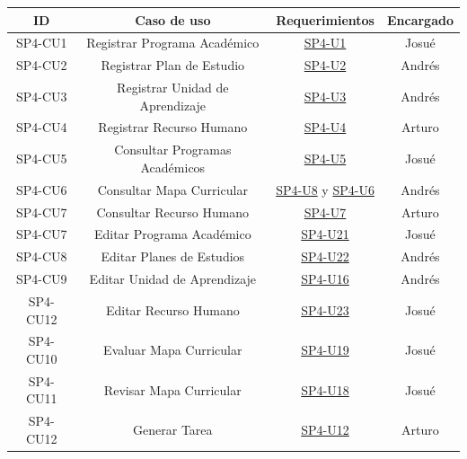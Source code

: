 \begin{center}
	\begin{tabular}{|c|c|c|c|}
		\hline
		ID         & Caso de uso                        & Requerimientos                                           & Encargado \\ \hline
        SP4-CU1    & Registrar Programa Académico       & \hyperref[SP4-U1]{SP4-U1}                                & Josué \\ \hline
        SP4-CU2    & Registrar Plan de Estudio          & \hyperref[SP4-U2]{SP4-U2}                                & Andrés \\ \hline
        SP4-CU3    & Registrar Unidad de Aprendizaje    & \hyperref[SP4-U3]{SP4-U3}                                & Andrés \\ \hline
        SP4-CU4    & Registrar Recurso Humano           & \hyperref[SP4-U4]{SP4-U4}                                & Arturo \\ \hline
        SP4-CU5    & Consultar Programas Académicos     & \hyperref[SP4-U5]{SP4-U5}                                & Josué \\ \hline
        SP4-CU6    & Consultar Mapa Curricular          & \hyperref[SP4-U8]{SP4-U8} y \hyperref[SP4-U6]{SP4-U6}    & Andrés \\ \hline
        SP4-CU7    & Consultar Recurso Humano           & \hyperref[SP4-U7]{SP4-U7}                                & Arturo \\ \hline
        SP4-CU7    & Editar Programa Académico          & \hyperref[SP4-U21]{SP4-U21}                              & Josué \\ \hline
        SP4-CU8    & Editar Planes de Estudios          & \hyperref[SP4-U22]{SP4-U22}                              & Andrés \\ \hline
        SP4-CU9    & Editar Unidad de Aprendizaje       & \hyperref[SP4-U16]{SP4-U16}                              & Andrés \\ \hline
        SP4-CU12   & Editar Recurso Humano              & \hyperref[SP4-U23]{SP4-U23}                              & Josué \\ \hline
        SP4-CU10   & Evaluar Mapa Curricular            & \hyperref[SP4-U19]{SP4-U19}                              & Josué \\ \hline
        SP4-CU11   & Revisar Mapa Curricular            & \hyperref[SP4-U18]{SP4-U18}                              & Josué \\ \hline
        SP4-CU12   & Generar Tarea                      & \hyperref[SP4-U12]{SP4-U12}                              & Arturo \\ \hline
    \end{tabular}
\end{center}
